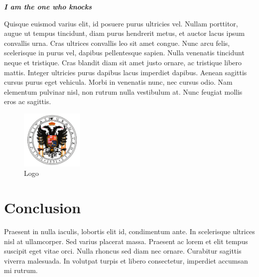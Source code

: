 \documentclass[a4paper, 12pt]{report}
\begin{document}
\begin{center}
	\textbf{\emph{I am the one who knocks}}
\end{center}

Quisque euismod varius elit, id posuere purus ultricies vel. Nullam porttitor,
augue ut tempus tincidunt, diam purus hendrerit metus, et auctor lacus ipsum
convallis urna. Cras ultrices convallis leo sit amet congue. Nunc arcu felis,
scelerisque in purus vel, dapibus pellentesque sapien. Nulla venenatis
tincidunt neque et tristique. Cras blandit diam sit amet justo ornare, ac
tristique libero mattis. Integer ultricies purus dapibus lacus imperdiet
dapibus. Aenean sagittis cursus purus eget vehicula. Morbi in venenatis nunc,
nec cursus odio. Nam elementum pulvinar nisl, non rutrum nulla vestibulum at.
Nunc feugiat mollis eros ac sagittis.

\begin{figure}[H]
    \centering
    \includegraphics[width=3cm]{figures/logos/logo_ugr.png}
    \caption{Logo}
    \label{logo}
\end{figure}

\section{Conclusion}
Praesent in nulla iaculis, lobortis elit id, condimentum
ante. In scelerisque ultrices nisl at ullamcorper. Sed varius placerat massa.
Praesent ac lorem et elit tempus suscipit eget vitae orci. Nulla rhoncus sed
diam nec ornare. Curabitur sagittis viverra malesuada. In volutpat turpis et
libero consectetur, imperdiet accumsan mi rutrum.
\end{document}
